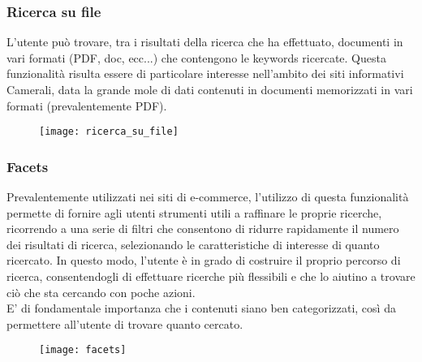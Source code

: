 			\subsubsection{Ricerca su file}
			L'utente può trovare, tra i risultati della ricerca che ha effettuato, documenti in vari formati (PDF, doc, ecc...) che contengono le keywords ricercate. Questa funzionalità risulta essere di particolare interesse nell'ambito dei siti informativi Camerali, data la grande mole di dati contenuti in documenti memorizzati in vari formati (prevalentemente PDF).
			
			\begin{figure}[htbp]
				\begin{center}
					\texttt{[image: ricerca\_su\_file]}
				\end{center}
			\end{figure}
		
			\subsubsection{Facets}
			Prevalentemente utilizzati nei siti di e-commerce, l'utilizzo di questa funzionalità permette di fornire agli utenti strumenti utili a raffinare le proprie ricerche, ricorrendo a una serie di filtri che consentono di ridurre rapidamente il numero dei risultati di ricerca, selezionando le caratteristiche di interesse di quanto ricercato. In questo modo, l'utente è in grado di costruire il proprio percorso di ricerca, consentendogli di effettuare ricerche più flessibili e che lo aiutino a trovare ciò che sta cercando con poche azioni. \\
			E' di fondamentale importanza che i contenuti siano ben categorizzati, così da permettere all'utente di trovare quanto cercato.
			
			\begin{figure}[htbp]
				\begin{center}
					\texttt{[image: facets]}
				\end{center}
			\end{figure}
		
